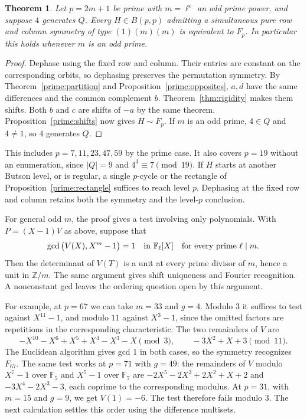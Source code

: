 \documentclass[11pt,a4paper]{article}
\newtheorem{theorem}{Theorem}[section]
\numberwithin{equation}{section}
\begin{document}
\begin{theorem}\label{prime:twoorbit}
Let $p=2m+1$ be prime with $m=\ell^e$ an odd prime power, and suppose $4$ generates $Q$. Every $H\in B(p,p)$ admitting a simultaneous pure row and column symmetry of type $(1)(m)(m)$ is equivalent to $F_p$. In particular this holds whenever $m$ is an odd prime.
\end{theorem}
\begin{proof}
Dephase using the fixed row and column. Their entries are constant on the corresponding orbits, so dephasing preserves the permutation symmetry. By Theorem~\ref{prime:partition} and Proposition~\ref{prime:opposites}, $a,d$ have the same differences and the common complement $b$. Theorem~\ref{thm:rigidity} makes them shifts. Both $b$ and $c$ are shifts of $-a$ by the same theorem. Proposition~\ref{prime:shifts} now gives $H\sim F_p$. If $m$ is an odd prime, $4\in Q$ and $4\ne1$, so $4$ generates $Q$.
\end{proof}

This includes $p=7,11,23,47,59$ by the prime case. It also covers $p=19$ without an enumeration, since $|Q|=9$ and $4^3\equiv7\pmod {19}$. If $H$ starts at another Butson level, or is regular, a single $p$-cycle or the rectangle of Proposition~\ref{prime:rectangle} suffices to reach level $p$. Dephasing at the fixed row and column retains both the symmetry and the level-$p$ conclusion.

For general odd $m$, the proof gives a test involving only polynomials. With $P=(X-1)V$ as above, suppose that
$$\gcd\big(V(X),X^m-1\big)=1\quad\hbox{in }\mathbb F_\ell[X]\quad\hbox{for every prime }\ell\mid m.$$
Then the determinant of $V(T)$ is a unit at every prime divisor of $m$, hence a unit in $\mathbb Z/m$. The same argument gives shift uniqueness and Fourier recognition. A nonconstant gcd leaves the ordering question open by this argument.

For example, at $p=67$ we can take $m=33$ and $g=4$. Modulo $3$ it suffices to test against $X^{11}-1$, and modulo $11$ against $X^3-1$, since the omitted factors are repetitions in the corresponding characteristic. The two remainders of $V$ are
$$-X^{10}-X^6+X^5+X^4-X^3-X\pmod3,\qquad -3X^2+X+3\pmod {11}.$$
The Euclidean algorithm gives gcd $1$ in both cases, so the symmetry recognizes $F_{67}$. The same test works at $p=71$ with $g=49$: the remainders of $V$ modulo $X^7-1$ over $\mathbb F_5$ and $X^5-1$ over $\mathbb F_7$ are $-2X^5-2X^3+2X^2+X+2$ and $-3X^4-2X^3-3$, each coprime to the corresponding modulus. At $p=31$, with $m=15$ and $g=9$, we get $V(1)=-6$. The test therefore fails modulo $3$. The next calculation settles this order using the difference multisets.
\end{document}
